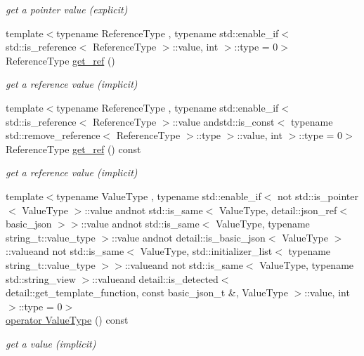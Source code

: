 \begin{DoxyCompactItemize}
\begin{DoxyCompactList}\small\item\em get a pointer value (explicit) \end{DoxyCompactList}\item 
{\footnotesize template$<$typename Reference\+Type , typename std\+::enable\+\_\+if$<$ std\+::is\+\_\+reference$<$ Reference\+Type $>$\+::value, int $>$\+::type  = 0$>$ }\\Reference\+Type \hyperlink{classnlohmann_1_1basic__json_afbd800010b67619463c0fce6e74f7878}{get\+\_\+ref} ()
\begin{DoxyCompactList}\small\item\em get a reference value (implicit) \end{DoxyCompactList}\item 
{\footnotesize template$<$typename Reference\+Type , typename std\+::enable\+\_\+if$<$ std\+::is\+\_\+reference$<$ Reference\+Type $>$\+::value andstd\+::is\+\_\+const$<$ typename std\+::remove\+\_\+reference$<$ Reference\+Type $>$\+::type $>$\+::value, int $>$\+::type  = 0$>$ }\\Reference\+Type \hyperlink{classnlohmann_1_1basic__json_a87e9e9cb2556fabfe042a4fabfc2c952}{get\+\_\+ref} () const 
\begin{DoxyCompactList}\small\item\em get a reference value (implicit) \end{DoxyCompactList}\item 
{\footnotesize template$<$typename Value\+Type , typename std\+::enable\+\_\+if$<$ not std\+::is\+\_\+pointer$<$ Value\+Type $>$\+::value andnot std\+::is\+\_\+same$<$ Value\+Type, detail\+::json\+\_\+ref$<$ basic\+\_\+json $>$$>$\+::value andnot std\+::is\+\_\+same$<$ Value\+Type, typename string\+\_\+t\+::value\+\_\+type $>$\+::value andnot detail\+::is\+\_\+basic\+\_\+json$<$ Value\+Type $>$\+::valueand not std\+::is\+\_\+same$<$ Value\+Type, std\+::initializer\+\_\+list$<$ typename string\+\_\+t\+::value\+\_\+type $>$$>$\+::valueand not std\+::is\+\_\+same$<$ Value\+Type, typename std\+::string\+\_\+view $>$\+::valueand detail\+::is\+\_\+detected$<$ detail\+::get\+\_\+template\+\_\+function, const basic\+\_\+json\+\_\+t \&, Value\+Type $>$\+::value, int $>$\+::type  = 0$>$ }\\\hyperlink{classnlohmann_1_1basic__json_a9cbcce20b78708de25c7ccb60c4ca7c5}{operator Value\+Type} () const 
\begin{DoxyCompactList}\small\item\em get a value (implicit) \end{DoxyCompactList}\end{DoxyCompactItemize}
